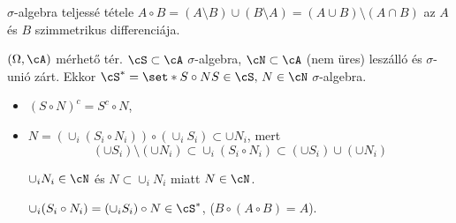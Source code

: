 \documentclass[aspectratio=169,notheorems,9pt,\option]{beamer}
\begin{document}
\begin{frame}{$\sigma$-algebra teljessé tétele}
  $A\circ B=(A\setminus B)\cup(B\setminus A)=(A\cup B)\setminus(A\cap B)$ 
  az $A$ és $B$ szimmetrikus differenciája.
  \begin{proposition}
    $(\Omega,\cA)$ mérhető tér. $\cS\subset\cA$ $\sigma$-algebra, 
    $\cN\subset\cA$ (nem üres) leszálló és $\sigma$-unió zárt. Ekkor
    $\cS^*=\set*{S\circ N}{S\in\cS,\,N\in\cN}$ $\sigma$-algebra.
  \end{proposition}
  \begin{itemize}
    \item $(S\circ N)^c=S^c\circ N$,
    \item $N=(\cup_i (S_i\circ N_i))\circ (\cup_i S_i)\subset \cup N_i$, mert
    \begin{displaymath}
      (\cup S_i)\setminus (\cup N_i)\subset\cup_i (S_i\circ N_i)\subset (\cup S_i)\cup (\cup N_i)
    \end{displaymath}   

    $\cup_i N_i\in\cN$ és $N\subset\cup_i N_i$ miatt  $N\in\cN$.

    $\cup_i (S_i\circ N_i)= (\cup_i S_i)\circ N\in\cS^*$, ($B\circ(A\circ B)=A$).
  \end{itemize}
\end{frame}
\end{document}
